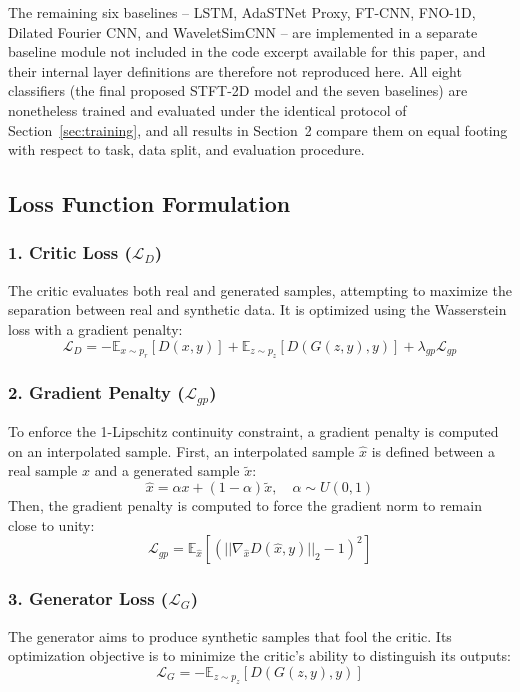 \documentclass[12pt]{article}
\begin{document}
The remaining six baselines -- LSTM, AdaSTNet Proxy, FT-CNN, FNO-1D, Dilated Fourier CNN, and WaveletSimCNN -- are implemented in a separate baseline module not included in the code excerpt available for this paper, and their internal layer definitions are therefore not reproduced here. All eight classifiers (the final proposed STFT-2D model and the seven baselines) are nonetheless trained and evaluated under the identical protocol of Section~\ref{sec:training}, and all results in Section~2 compare them on equal footing with respect to task, data split, and evaluation procedure.

\subsection{Loss Function Formulation}

\subsubsection*{1. Critic Loss ($\mathcal{L}_D$)}
The critic evaluates both real and generated samples, attempting to maximize the separation between real and synthetic data. It is optimized using the Wasserstein loss with a gradient penalty:
\begin{equation}
    \mathcal{L}_{D} = -\mathbb{E}_{x\sim p_{r}}[D(x,y)] + \mathbb{E}_{z\sim p_{z}}[D(G(z,y),y)] + \lambda_{gp}\mathcal{L}_{gp}
\end{equation}

\subsubsection*{2. Gradient Penalty ($\mathcal{L}_{gp}$)}
To enforce the 1-Lipschitz continuity constraint, a gradient penalty is computed on an interpolated sample. First, an interpolated sample $\hat{x}$ is defined between a real sample $x$ and a generated sample $\tilde{x}$:
\begin{equation}
    \hat{x} = \alpha x + (1-\alpha)\tilde{x}, \quad \alpha \sim U(0,1)
\end{equation}
Then, the gradient penalty is computed to force the gradient norm to remain close to unity:
\begin{equation}
    \mathcal{L}_{gp} = \mathbb{E}_{\hat{x}}\left[\left(||\nabla_{\hat{x}}D(\hat{x},y)||_{2}-1\right)^{2}\right]
\end{equation}

\subsubsection*{3. Generator Loss ($\mathcal{L}_G$)}
The generator aims to produce synthetic samples that fool the critic. Its optimization objective is to minimize the critic's ability to distinguish its outputs:
\begin{equation}
    \mathcal{L}_{G} = -\mathbb{E}_{z\sim p_{z}}[D(G(z,y),y)]
\end{equation}
\end{document}
